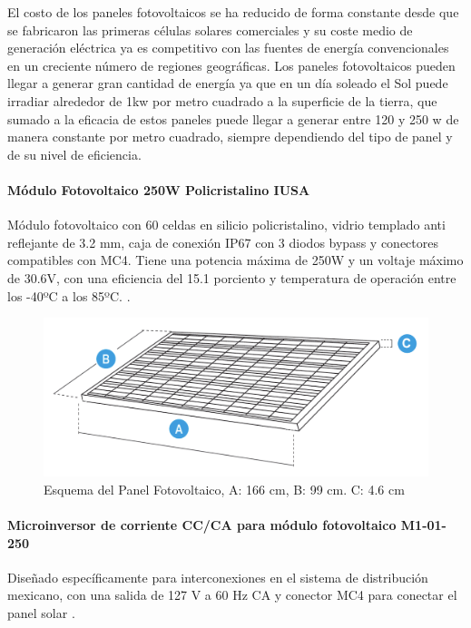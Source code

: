 El costo de los paneles fotovoltaicos se ha reducido de forma constante desde que se fabricaron las primeras células solares comerciales y su coste medio de generación eléctrica ya es competitivo con las fuentes de energía convencionales en un creciente número de regiones geográficas.
Los paneles fotovoltaicos pueden llegar a generar gran cantidad de energía ya que en un día soleado el Sol puede irradiar alrededor de 1kw por metro cuadrado a la superficie de la tierra, que sumado a la eficacia de estos paneles puede llegar a generar entre 120 y 250 w de manera constante por metro cuadrado, siempre dependiendo del tipo de panel y de su nivel de eficiencia.

\paragraph{Módulo Fotovoltaico 250W Policristalino IUSA}
Módulo fotovoltaico con 60 celdas en silicio policristalino, vidrio templado anti reflejante de 3.2 mm, caja de conexión IP67 con 3 diodos bypass y conectores compatibles con MC4.
Tiene una potencia máxima de 250W y un voltaje máximo de 30.6V, con una eficiencia del 15.1 porciento y temperatura de operación entre los -40ºC a los 85ºC. \citep{MarcoTeorico3}.

\begin{figure}[H]
	\centering
	\includegraphics[scale=.25]{Capitulo2/images/panel.png}
	\caption{Esquema del Panel Fotovoltaico, A: 166 cm, B: 99 cm. C: 4.6 cm}
	\label{fig:diagrama_dispensador}
\end{figure}

\paragraph{Microinversor de corriente CC/CA para módulo fotovoltaico M1-01-250}
Diseñado específicamente para interconexiones en el sistema de distribución mexicano, con una salida de 127 V a 60 Hz CA y conector MC4 para conectar el panel solar \citep{MarcoTeorico3}.

